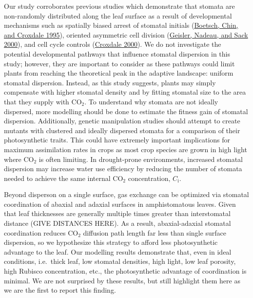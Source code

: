 \documentclass[12pt,halfline,a4paper,]{ouparticle}
\begin{document}
Our study corroborates previous studies which demonstrate that stomata
are non-randomly distributed along the leaf surface as a result of
developmental mechanisms such as spatially biased arrest of stomatal
initials (\protect\hyperlink{ref-boetsch_arrest_1995}{Boetsch, Chin, and
Croxdale 1995}), oriented asymmetric cell division
(\protect\hyperlink{ref-geisler_oriented_2000}{Geisler, Nadeau, and Sack
2000}), and cell cycle controls
(\protect\hyperlink{ref-croxdale_stomatal_2000}{Croxdale 2000}). We do
not investigate the potential developmental pathways that influence
stomatal dispersion in this study; however, they are important to
consider as these pathways could limit plants from reaching the
theoretical peak in the adaptive landscape: uniform stomatal dispersion.
Instead, as this study suggests, plants may simply compensate with
higher stomatal density and by fitting stomatal size to the area that
they supply with CO\(_2\). To understand why stomata are not ideally
dispersed, more modelling should be done to estimate the fitness gain of
stomatal dispersion. Additionally, genetic manipulation studies should
attempt to create mutants with clustered and ideally dispersed stomata
for a comparison of their photosynthetic traits. This could have
extremely important implications for maximum assimilation rates in crops
as most crop species are grown in high light where CO\(_2\) is often
limiting. In drought-prone environments, increased stomatal dispersion
may increase water use efficiency by reducing the number of stomata
needed to achieve the same internal CO\(_2\) concentration,
\(C_\text{i}\).

Beyond disperson on a single surface, gas exchange can be optimized via
stomatal coordination of abaxial and adaxial surfaces in amphistomatous
leaves. Given that leaf thicknesses are generally multiple times greater
than interstomatal distance (GIVE DISTANCES HERE). As a result,
abaxial-adaxial stomatal coordination reduces CO\(_2\) diffusion path
length far less than single surface dispersion, so we hypothesize this
strategy to afford less photosynthetic advantage to the leaf. Our
modelling results demonstrate that, even in ideal conditions, i.e.~thick
leaf, low stomatal densities, high light, low leaf porosity, high
Rubisco concentration, etc., the photosynthetic advantage of
coordination is minimal. We are not surprised by these results, but
still highlight them here as we are the first to report this finding.
\end{document}
